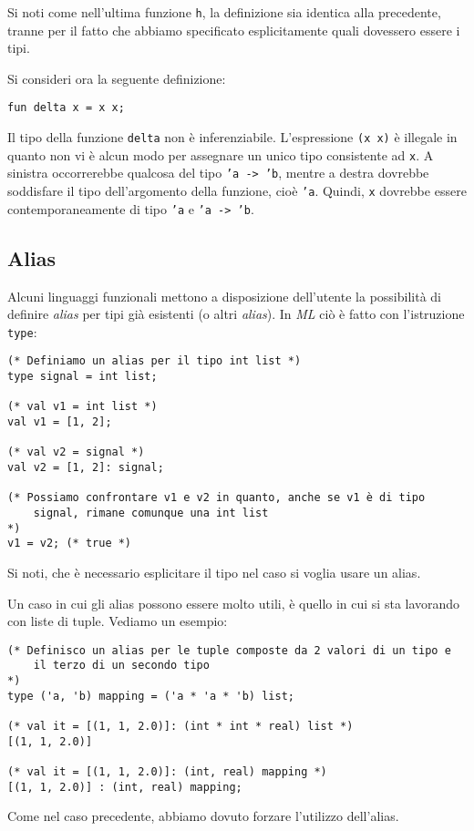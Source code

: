 \documentclass[12pt, a4paper]{report}
\theoremstyle{definition}
\newcommand{\code}[1]{\texttt{#1}}
\begin{document}
Si noti come nell'ultima funzione \code{h}, la definizione sia identica alla
precedente, tranne per il fatto che abbiamo specificato esplicitamente quali
dovessero essere i tipi.

Si consideri ora la seguente definizione:
\begin{lstlisting}
fun delta x = x x;
\end{lstlisting}

Il tipo della funzione \code{delta} non è inferenziabile. L'espressione
\code{(x x)} è illegale in quanto non vi è alcun modo per assegnare un unico tipo
consistente ad \code{x}. A sinistra occorrerebbe qualcosa del tipo \code{'a -> 'b},
mentre a destra dovrebbe soddisfare il tipo dell'argomento della funzione, cioè
\code{'a}. Quindi, \code{x} dovrebbe essere contemporaneamente di tipo \code{'a}
e \code{'a -> 'b}.

\subsection{Alias}
Alcuni linguaggi funzionali mettono a disposizione dell'utente la possibilità di
definire \emph{alias} per tipi già esistenti (o altri \emph{alias}). In \emph{ML}
ciò è fatto con l'istruzione \code{type}:
\begin{lstlisting}
(* Definiamo un alias per il tipo int list *)
type signal = int list;

(* val v1 = int list *)
val v1 = [1, 2];

(* val v2 = signal *)
val v2 = [1, 2]: signal;

(* Possiamo confrontare v1 e v2 in quanto, anche se v1 è di tipo
    signal, rimane comunque una int list
*)
v1 = v2; (* true *)
\end{lstlisting}
Si noti, che è necessario esplicitare il tipo nel caso si voglia usare un alias.

Un caso in cui gli alias possono essere molto utili, è quello in cui si sta
lavorando con liste di tuple. Vediamo un esempio:
\begin{lstlisting}
(* Definisco un alias per le tuple composte da 2 valori di un tipo e
    il terzo di un secondo tipo
*)
type ('a, 'b) mapping = ('a * 'a * 'b) list;

(* val it = [(1, 1, 2.0)]: (int * int * real) list *)
[(1, 1, 2.0)]

(* val it = [(1, 1, 2.0)]: (int, real) mapping *)
[(1, 1, 2.0)] : (int, real) mapping;
\end{lstlisting}
Come nel caso precedente, abbiamo dovuto forzare l'utilizzo dell'alias.
\end{document}
